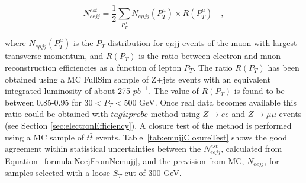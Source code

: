 \begin{equation} \label{formula:NeejFromNemujj}
N_{eejj}^{est.} = \frac{1}{2}\sum_{P_{T}^{\mu}} N_{e\mu jj}(P_{T}^{\mu}) \times R(P_{T}^{\mu}) \quad , 
\end{equation}

where $N_{e\mu jj}(P_{T}^{\mu})$ is the $P_{T}$ distribution for e$\mu$jj events of the muon  
with largest transverse momentum, and $R(P_{T})$ is the ratio between electron 
and muon reconstruction efficiencies as a function of lepton $P_{T}$. The ratio $R(P_{T})$ has been obtained 
using a MC FullSim sample of Z+jets events with an equivalent integrated luminosity of about 275 $pb^{-1}$.
The value of $R(P_{T})$ is found to be between 0.85-0.95 for $30 < P_{T} < 500$ GeV.
Once real data becomes available this ratio could be obtained with $tag\&probe$ method using $Z \rightarrow ee$ and 
$Z \rightarrow \mu\mu$ events (see Section \ref{sec:electronEfficiency}).
A closure test of the method is performed using a MC sample of $t\bar{t}$ events. 
Table~\ref{tab:emujjClosureTest} shows the good agreement within statistical uncertainties between 
the $N_{eejj}^{est.}$, calculated from Equation~\ref{formula:NeejFromNemujj}, 
and the prevision from MC, $N_{eejj}$, for samples selected with a loose $S_{T}$ cut of 300 GeV.   


